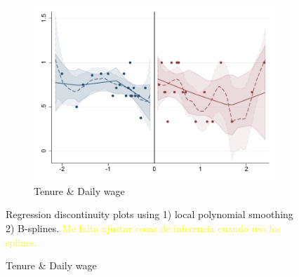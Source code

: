 \documentclass[oneside,11pt]{article}
\begin{document}
\begin{figure}[H]
\begin{center}
\begin{subfigure}{0.31\textwidth}
\caption{Tenure \& Daily wage}
        \includegraphics[width=\textwidth]{Figuras/rdplot_conflicto_arreglado_2_4_3.pdf}
    \end{subfigure}
  \end{center}
  
    \scriptsize Regression discontinuity plots using 1) local polynomial smoothing 2) B-splines. \textcolor{yellow}{Me falta ajustar cosas de inferencia cuando uso los splines.}
\end{figure}










\newpage

\end{document}
